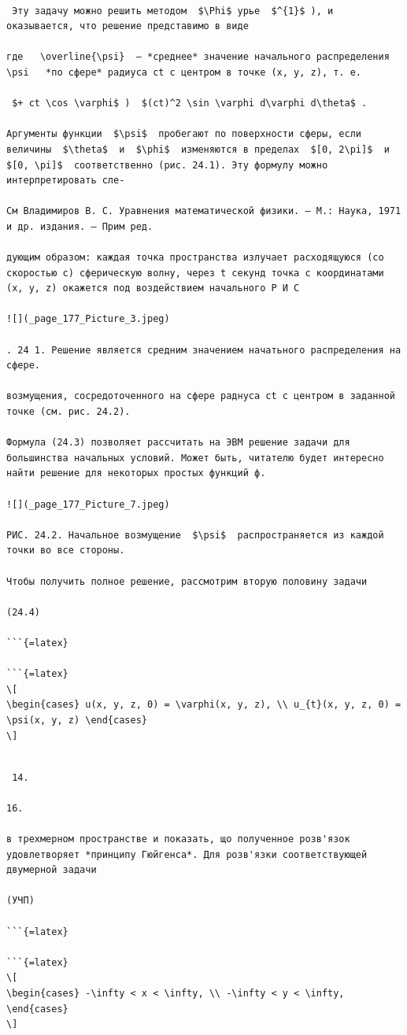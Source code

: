 \documentclass[
  ukrainian,
]{article}
\begin{document}
\begin{verbatim}

 Эту задачу можно решить методом  $\Phi$ урье  $^{1}$ ), и оказывается, что решение представимо в виде

где   \overline{\psi}  — *среднее* значение начального распределения   \psi   *по сфере* радиуса ct с центром в точке (x, y, z), т. е.

 $+ ct \cos \varphi$ )  $(ct)^2 \sin \varphi d\varphi d\theta$ .

Аргументы функции  $\psi$  пробегают по поверхности сферы, если величины  $\theta$  и  $\phi$  изменяются в пределах  $[0, 2\pi]$  и  $[0, \pi]$  соответственно (рис. 24.1). Эту формулу можно интерпретировать сле-

См Владимиров В. С. Уравнения математической физики. — М.: Наука, 1971 и др. издания. — Прим ред.

дующим образом: каждая точка пространства излучает расходящуюся (со скоростью c) сферическую волну, через t секунд точка с координатами (x, y, z) окажется под воздействием начального Р И С

![](_page_177_Picture_3.jpeg)

. 24 1. Решение является средним значением начатьного распределения на сфере.

возмущения, сосредоточенного на сфере раднуса ct с центром в заданной точке (см. рис. 24.2).

Формула (24.3) позволяет рассчитать на ЭВМ решение задачи для большинства начальных условий. Может быть, читателю будет интересно найти решение для некоторых простых функций ф.

![](_page_177_Picture_7.jpeg)

РИС. 24.2. Начальное возмущение  $\psi$  распространяется из каждой точки во все стороны.

Чтобы получить полное решение, рассмотрим вторую половину задачи

(24.4)

```{=latex}

```{=latex}
\[
\begin{cases} u(x, y, z, 0) = \varphi(x, y, z), \\ u_{t}(x, y, z, 0) = \psi(x, y, z) \end{cases}
\]
\end{verbatim}

\begin{verbatim}

 14.

16.

в трехмерном пространстве и показать, що полученное розв'язок удовлетворяет *принципу Гюйгенса*. Для розв'язки соответствующей двумерной задачи

(УЧП)

```{=latex}

```{=latex}
\[
\begin{cases} -\infty < x < \infty, \\ -\infty < y < \infty, \end{cases}
\]
\end{verbatim}
\end{document}
